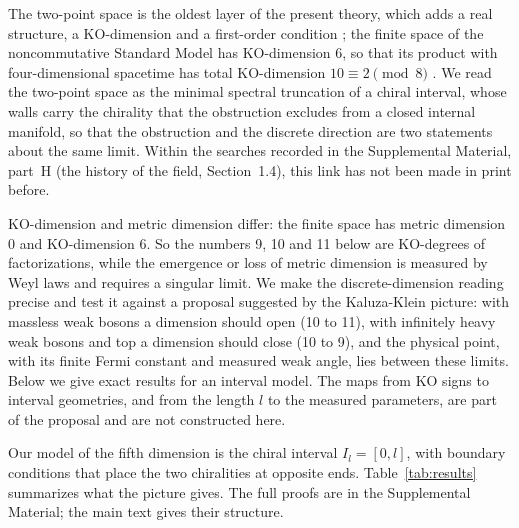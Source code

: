\documentclass[aps,prd,reprint,onecolumn,nofootinbib,amsmath,amssymb,floatfix]{revtex4-2}
\theoremstyle{plain}
\newcommand{\supp}[1]{Supplemental Material, part~#1}
\begin{document}
The two-point space is the oldest layer of the present theory, which adds a real structure, a KO-dimension and a first-order condition \cite{Connes2006,CCM2007,CC2008}; the finite space of the noncommutative Standard Model has KO-dimension 6, so that its product with four-dimensional spacetime has total KO-dimension $10\equiv2\pmod 8$ \cite{Connes2006,Barrett2007,CCM2007}. We read the two-point space as the minimal spectral truncation of a chiral interval, whose walls carry the chirality that the obstruction excludes from a closed internal manifold, so that the obstruction and the discrete direction are two statements about the same limit. Within the searches recorded in the \supp{H} (the history of the field, Section~1.4), this link has not been made in print before.

KO-dimension and metric dimension differ: the finite space has metric dimension 0 and KO-dimension 6. So the numbers 9, 10 and 11 below are KO-degrees of factorizations, while the emergence or loss of metric dimension is measured by Weyl laws and requires a singular limit. We make the discrete-dimension reading precise and test it against a proposal suggested by the Kaluza-Klein picture: with massless weak bosons a dimension should open (10 to 11), with infinitely heavy weak bosons and top a dimension should close (10 to 9), and the physical point, with its finite Fermi constant and measured weak angle, lies between these limits. Below we give exact results for an interval model. The maps from KO signs to interval geometries, and from the length $l$ to the measured parameters, are part of the proposal and are not constructed here.

Our model of the fifth dimension is the chiral interval $I_l=[0,l]$, with boundary conditions that place the two chiralities at opposite ends. Table~\ref{tab:results} summarizes what the picture gives. The full proofs are in the Supplemental Material; the main text gives their structure.
\end{document}
